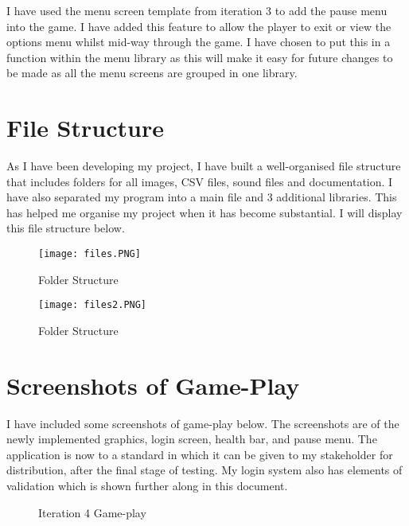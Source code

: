 \documentclass[12pt]{report}
\begin{document}
\normalsize

I have used the menu screen template from iteration 3 to add the pause menu into the game. I have added this feature to allow the player to exit or view the options menu whilst mid-way through the game. I have chosen to put this in a function within the menu library as this will make it easy for future changes to be made as all the menu screens are grouped in one library. 

\section{File Structure}
As I have been developing my project, I have built a well-organised file structure that includes folders for all images, CSV files, sound files and documentation. I have also separated my program into a main file and 3 additional libraries. This has helped me organise my project when it has become substantial. I will display this file structure below.

\begin{figure}[H]
    \centering
    \texttt{[image: files.PNG]}
    \caption{Folder Structure}
\end{figure}

\begin{figure}[H]
    \centering
    \texttt{[image: files2.PNG]}
    \caption{Folder Structure}
\end{figure}


\pagebreak

\section{Screenshots of Game-Play}
I have included some screenshots of game-play below. The screenshots are of the newly implemented graphics, login screen, health bar, and pause menu. The application is now to a standard in which it can be given to my stakeholder for distribution, after the final stage of testing. My login system also has elements of validation which is shown further along in this document.

 \begin{figure}[H]
    \begin{center}
    \end{center}
    \caption{Iteration 4 Game-play}
\end{figure}
\end{document}
